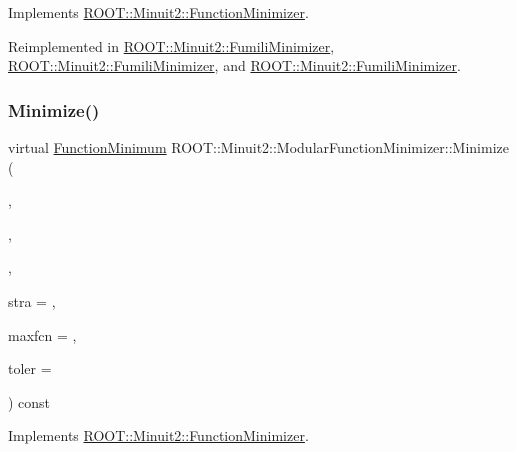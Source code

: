 Implements \mbox{\hyperlink{classROOT_1_1Minuit2_1_1FunctionMinimizer_aa664d755554be28f42be8270b8c35139}{R\+O\+O\+T\+::\+Minuit2\+::\+Function\+Minimizer}}.



Reimplemented in \mbox{\hyperlink{classROOT_1_1Minuit2_1_1FumiliMinimizer_ab9ec6dd4a0e664db7d23a3ea3b0a3c75}{R\+O\+O\+T\+::\+Minuit2\+::\+Fumili\+Minimizer}}, \mbox{\hyperlink{classROOT_1_1Minuit2_1_1FumiliMinimizer_ab9ec6dd4a0e664db7d23a3ea3b0a3c75}{R\+O\+O\+T\+::\+Minuit2\+::\+Fumili\+Minimizer}}, and \mbox{\hyperlink{classROOT_1_1Minuit2_1_1FumiliMinimizer_ab9ec6dd4a0e664db7d23a3ea3b0a3c75}{R\+O\+O\+T\+::\+Minuit2\+::\+Fumili\+Minimizer}}.

\mbox{\label{classROOT_1_1Minuit2_1_1ModularFunctionMinimizer_a0a881c0e1c53c2144c437cfb18f1971e}} 
\subsubsection{\texorpdfstring{Minimize()}{Minimize()}\hspace{0.1cm}{\footnotesize\ttfamily [3/33]}}
{\footnotesize\ttfamily virtual \mbox{\hyperlink{classROOT_1_1Minuit2_1_1FunctionMinimum}{Function\+Minimum}} R\+O\+O\+T\+::\+Minuit2\+::\+Modular\+Function\+Minimizer\+::\+Minimize (\begin{DoxyParamCaption}\item[{const \mbox{\hyperlink{classROOT_1_1Minuit2_1_1FCNBase}{F\+C\+N\+Base}} \&}]{,  }\item[{const std\+::vector$<$ double $>$ \&}]{,  }\item[{const std\+::vector$<$ double $>$ \&}]{,  }\item[{unsigned int}]{stra = {},  }\item[{unsigned int}]{maxfcn = {},  }\item[{double}]{toler = {} }\end{DoxyParamCaption}) const\hspace{0.3cm}{\ttfamily [virtual]}}



Implements \mbox{\hyperlink{classROOT_1_1Minuit2_1_1FunctionMinimizer_aa664d755554be28f42be8270b8c35139}{R\+O\+O\+T\+::\+Minuit2\+::\+Function\+Minimizer}}.



